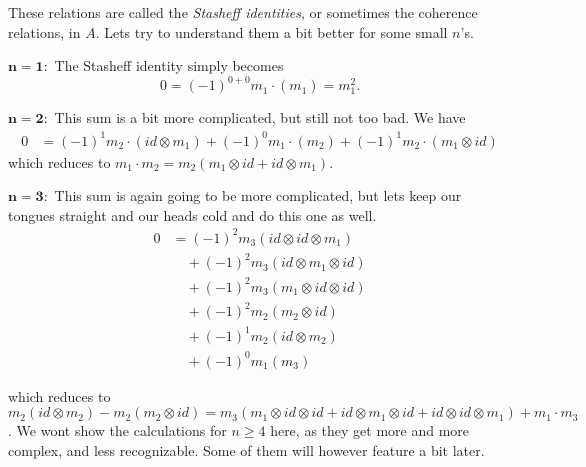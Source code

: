 These relations are called the \emph{Stasheff identities}, or sometimes the coherence relations, in $A$. Lets try to understand them a bit better for some small $n$'s. 

$\mathbf{n=1 :}$ The Stasheff identity simply becomes
\begin{equation*}
    0 = (-1)^{0+0}m_1 \cdot (m_1) = m_1^2 .
\end{equation*}

$\mathbf{n=2 :}$ This sum is a bit more complicated, but still not too bad. We have
\begin{align*}
    0 
    &= (-1)^{1}m_2\cdot(id\otimes m_1)+(-1)^{0}m_1\cdot (m_2)+(-1)^{1}m_2\cdot (m_1\otimes id)
\end{align*}
which reduces to $m_1 \cdot m_2 = m_2(m_1\otimes id + id\otimes m_1)$. 

$\mathbf{n=3 :}$ This sum is again going to be more complicated, but lets keep our tongues straight and our heads cold and do this one as well. 
\begin{align*}
    0 
    &= (-1)^{2}m_3(id\otimes id \otimes m_1) \\
    &\quad + (-1)^{2}m_3(id\otimes m_1 \otimes id) \\
    &\quad + (-1)^{2}m_3(m_1\otimes id \otimes id) \\
    &\quad + (-1)^{2}m_2(m_2\otimes id) \\
    &\quad + (-1)^{1}m_2(id\otimes m_2) \\
    &\quad + (-1)^{0}m_1(m_3) 
\end{align*}

which reduces to $m_2(id\otimes m_2) - m_2(m_2\otimes id) = m_3(m_1\otimes id \otimes id + id\otimes m_1 \otimes id + id\otimes id \otimes m_1) + m_1\cdot m_3 $. We wont show the calculations for $n \geq 4$ here, as they get more and more complex, and less recognizable. Some of them will however feature a bit later.   

